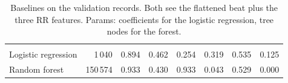 \begin{table}[H]
  \centering
  \caption{Baselines on the validation records. Both see the flattened beat plus the three RR features. Params: coefficients for the logistic regression, tree nodes for the forest.}
  \label{tab:baselines}
  \begin{tabularx}{\linewidth}{lRRRRRRR}
     &  &  &  &  &  &  &  \\
    Logistic regression & 1\,040 & 0.894 & 0.462 & 0.254 & 0.319 & 0.535 & 0.125 \\
    Random forest & 150\,574 & 0.933 & 0.430 & 0.933 & 0.043 & 0.529 & 0.000 \\
    \bottomrule
  \end{tabularx}
\end{table}
